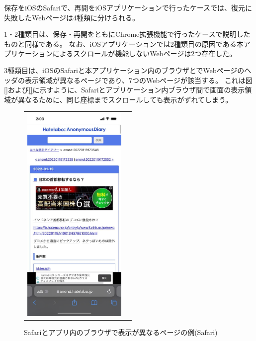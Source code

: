 保存をiOSのSafariで、再開をiOSアプリケーションで行ったケースでは、復元に失敗したWebページは4種類に分けられる。

1・2種類目は、保存・再開をともにChrome拡張機能で行ったケースで説明したものと同様である。
なお、iOSアプリケーションでは2種類目の原因である本アプリケーションによるスクロールが機能しないWebページは2つ存在した。

3種類目は、iOSのSafariと本アプリケーション内のブラウザとでWebページのヘッダの表示領域が異なるページであり、7つのWebページが該当する。
これは図\ref{}および\ref{}に示すように、Safariとアプリケーション内ブラウザ間で画面の表示領域が異なるために、同じ座標までスクロールしても表示がずれてしまう。

\begin{figure}[htbp]
  \begin{tabular}{cc}
    \begin{minipage}[t]{0.45\hsize}
      \caption{Safariとアプリ内のブラウザで表示が異なるページの例(Safari)}
      \label{fig:evl-consideration-scroll-position-ios-diff-safari}
      \begin{center}
        \includegraphics[bb=0 0 585 1266,width=5cm]{img/060_evaluation/consideration/scroll_position/example/ios-diff-safari.pdf}
      \end{center}
    \end{minipage} &


\end{tabular}
\end{figure}
